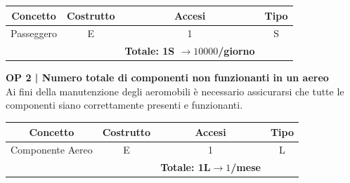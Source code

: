 \begin{tabular}{ c c c c}
	\hline
	\rowcolor{airforceblue}
	\textbf{\color{white}Concetto} & \textbf{\color{white}Costrutto} & \textbf{\color{white}Accesi} & \textbf{\color{white}Tipo}\\
	\hline
	\textsf{\small Passeggero} & \textsf{\small E} & \textsf{\small 1} &  \textsf{\small S}\\
	\hline
	\rowcolor{airforceblue}
	\textsf{\small } & \textsf{\small } & \textbf{\color{white}Totale: 1S $\rightarrow 10000$/giorno} \textsf{\small } & \textsf{\small }\\ %
	\hline
\end{tabular}

\vspace{.6cm}


\textbf{\small OP 2 | Numero totale di componenti non funzionanti in un aereo}\\

\textsf{\small Ai fini della manutenzione degli aeromobili è necessario assicurarsi che tutte le componenti siano correttamente presenti e funzionanti.}\break

\begin{tabular}{ c c c c}
	\hline
	\rowcolor{airforceblue}
	\textbf{\color{white}Concetto} & \textbf{\color{white}Costrutto} & \textbf{\color{white}Accesi} & \textbf{\color{white}Tipo}\\
	\hline
	\textsf{\small Componente Aereo} & \textsf{\small E} & \textsf{\small 1} &  \textsf{\small L}\\
	\hline
	\rowcolor{airforceblue}
	\textsf{\small } & \textsf{\small } & \textbf{\color{white}Totale: 1L$\rightarrow 1$/mese} \textsf{\small } & \textsf{\small }\\ 
	\hline
\end{tabular}

\vspace{.6cm}

